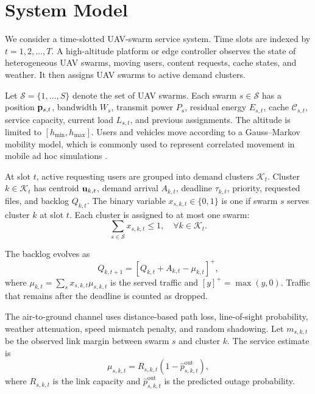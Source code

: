 \section{System Model}
We consider a time-slotted UAV-swarm service system. Time slots are indexed by $t=1,2,\ldots,T$. A high-altitude platform or edge controller observes the state of heterogeneous UAV swarms, moving users, content requests, cache states, and weather. It then assigns UAV swarms to active demand clusters.

Let $\mathcal{S}=\{1,\ldots,S\}$ denote the set of UAV swarms. Each swarm $s\in\mathcal{S}$ has a position $\mathbf{p}_{s,t}$, bandwidth $W_s$, transmit power $P_s$, residual energy $E_{s,t}$, cache $\mathcal{C}_{s,t}$, service capacity, current load $L_{s,t}$, and previous assignments. The altitude is limited to $[h_{\min},h_{\max}]$. Users and vehicles move according to a Gauss--Markov mobility model, which is commonly used to represent correlated movement in mobile ad hoc simulations \cite{camp2002mobility}.

At slot $t$, active requesting users are grouped into demand clusters $\mathcal{K}_t$. Cluster $k\in\mathcal{K}_t$ has centroid $\mathbf{u}_{k,t}$, demand arrival $A_{k,t}$, deadline $\tau_{k,t}$, priority, requested files, and backlog $Q_{k,t}$. The binary variable $x_{s,k,t}\in\{0,1\}$ is one if swarm $s$ serves cluster $k$ at slot $t$. Each cluster is assigned to at most one swarm:
\begin{equation}
\sum_{s\in\mathcal{S}} x_{s,k,t} \leq 1, \quad \forall k\in\mathcal{K}_t.
\label{eq:assignment_one}
\end{equation}

The backlog evolves as
\begin{equation}
Q_{k,t+1}=\left[Q_{k,t}+A_{k,t}-\mu_{k,t}\right]^+,
\label{eq:queue_update}
\end{equation}
where $\mu_{k,t}=\sum_s x_{s,k,t}\mu_{s,k,t}$ is the served traffic and $[y]^+=\max(y,0)$. Traffic that remains after the deadline is counted as dropped.

The air-to-ground channel uses distance-based path loss, line-of-sight probability, weather attenuation, speed mismatch penalty, and random shadowing. Let $m_{s,k,t}$ be the observed link margin between swarm $s$ and cluster $k$. The service estimate is
\begin{equation}
\mu_{s,k,t}=R_{s,k,t}\left(1-\hat{p}^{\mathrm{out}}_{s,k,t}\right),
\label{eq:service_rate}
\end{equation}
where $R_{s,k,t}$ is the link capacity and $\hat{p}^{\mathrm{out}}_{s,k,t}$ is the predicted outage probability.

